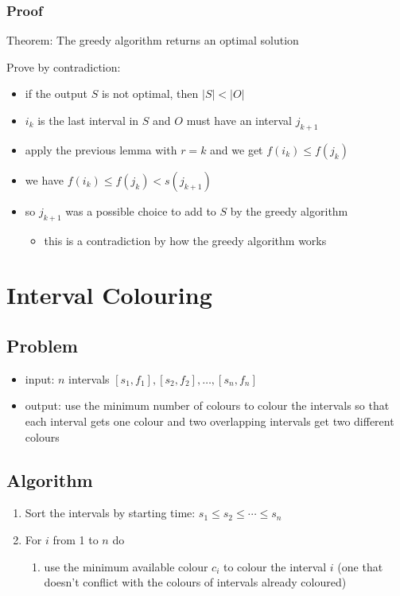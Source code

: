 \documentclass[11pt]{article}
\begin{document}
\subsubsection{Proof}
\label{sec:org691bd48}
Theorem: The greedy algorithm returns an optimal solution

Prove by contradiction:
\begin{itemize}
\item if the output \(S\) is not optimal, then \(|S| < |O|\)
\item \(i_{k}\) is the last interval in \(S\) and \(O\) must have
an interval \(j_{k+1}\)
\item apply the previous lemma with \(r = k\) and we get \(f(i_{k}) \le f(j_{k})\)
\item we have \(f(i_{k}) \le f(j_{k}) < s(j_{k+1})\)
\item so \(j_{k+1}\) was a possible choice to add to \(S\) by the greedy algorithm
\begin{itemize}
\item this is a contradiction by how the greedy algorithm works
\end{itemize}
\end{itemize}
\section{Interval Colouring}
\label{sec:orge28b06d}
\subsection{Problem}
\label{sec:org44f9dcb}
\begin{itemize}
\item input: \(n\) intervals \([s_{1}, f_{1}], [s_{2}, f_{2}], \dots, [s_{n}, f_{n}]\)
\item output: use the minimum number of colours to colour the intervals
so that each interval gets one colour and two overlapping intervals get two
different colours
\end{itemize}
\subsection{Algorithm}
\label{sec:org0755402}
\begin{enumerate}
\item Sort the intervals by starting time: \(s_{1} \le s_{2} \le \cdots \le s_{n}\)
\item For \(i\) from 1 to \(n\) do
\begin{enumerate}
\item use the minimum available colour \(c_{i}\) to colour the interval \(i\)
(one that doesn't conflict with the colours of intervals already coloured)
\end{enumerate}
\end{enumerate}
\end{document}
